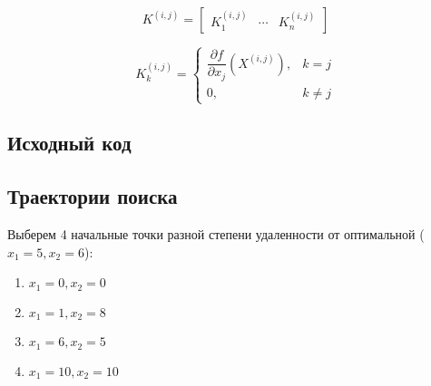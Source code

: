 \begin{equation*}
K^{(i,j)} = \begin{bmatrix} K_1^{(i,j)} & \cdots & K_n^{(i,j)} \end{bmatrix}
\end{equation*}

\begin{equation*}
K_k^{(i,j)} = 
\begin{cases}
\dfrac{\partial f}{\partial x_j}\left( X^{(i,j)} \right), &k = j\\
0, &k \neq j
\end{cases}
\end{equation*}


%
%
%
%

\newpage

\subsection{Исходный код}



\subsection{Траектории поиска}

Выберем 4 начальные точки разной степени удаленности от оптимальной ($x_1 = 5, x_2 = 6$): 
\begin{multicols}{2} 
\begin{enumerate}
	\setlength{\itemsep}{0em}
	\item $x_1 = 0, x_2 = 0$
	\item $x_1 = 1, x_2 = 8$
	\item $x_1 = 6, x_2 = 5$
	\item $x_1 = 10, x_2 = 10$
\end{enumerate}
\end{multicols}

